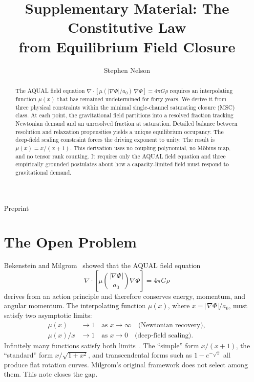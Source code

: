 \documentclass[twocolumn]{iopjournal}
\renewcommand{\articletype}[1]{%
  {\vspace*{-8mm}\noindent \Large \sf Preprint}\par
  \vspace*{6mm}\noindent{\scriptsize \sf{\bfseries \MakeUppercase{#1}}}}
\begin{document}
\articletype{Supplementary Material}

\title{Supplementary Material: The Constitutive Law\\from Equilibrium Field Closure}

\author{Stephen Nelson}



\begin{abstract}
The AQUAL field equation
$\nabla \cdot [\mu(|\nabla\Phi|/a_0)\,\nabla\Phi] = 4\pi G\rho$
requires an interpolating function $\mu(x)$ that has remained
undetermined for forty years. We derive it from three physical
constraints within the minimal single-channel saturating closure
(MSC) class. At each point, the gravitational field partitions
into a resolved fraction tracking Newtonian demand and an
unresolved fraction at saturation. Detailed balance between
resolution and relaxation propensities yields a unique equilibrium
occupancy. The deep-field scaling constraint forces the driving
exponent to unity. The result is $\mu(x) = x/(x+1)$. This
derivation uses no coupling polynomial, no M\"{o}bius map, and
no tensor rank counting. It requires only the AQUAL field equation
and three empirically grounded postulates about how a
capacity-limited field must respond to gravitational demand.
\end{abstract}


\section*{The Open Problem}

Bekenstein and Milgrom~\cite{BekensteinMilgrom1984} showed that the
AQUAL field equation
\begin{equation}
  \nabla \cdot \!\left[\mu\!\left(\frac{|\nabla\Phi|}{a_0}\right)
  \nabla\Phi\right] = 4\pi G\rho
  \label{eq:aqual}
\end{equation}
derives from an action principle and therefore conserves energy,
momentum, and angular momentum. The interpolating function $\mu(x)$,
where $x = |\nabla\Phi|/a_0$, must satisfy two asymptotic limits:
\begin{align}
  \mu(x) &\to 1 \quad \text{as } x \to \infty
    \quad \text{(Newtonian recovery)}, \label{eq:P1} \\
  \mu(x)/x &\to 1 \quad \text{as } x \to 0
    \quad \text{(deep-field scaling)}. \label{eq:P2}
\end{align}
Infinitely many functions satisfy both
limits~\cite{FamaeyBinney2005,Milgrom1983}. The ``simple'' form
$x/(x+1)$, the ``standard'' form $x/\sqrt{1+x^2}$, and
transcendental forms such as $1 - e^{-\sqrt{x}}$ all produce flat
rotation curves. Milgrom's original framework does not select among
them. This note closes the gap.
\end{document}
